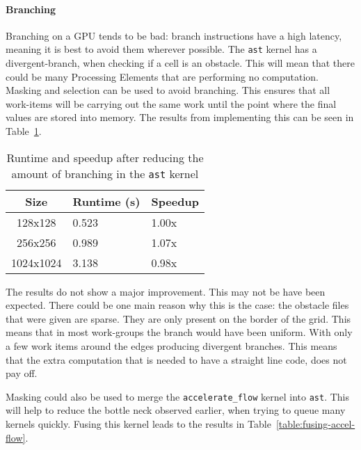 



\paragraph{Branching}
Branching on a GPU tends to be bad: branch instructions have a high latency, meaning it is best to avoid them wherever possible. The \texttt{ast} kernel has a divergent-branch, when checking if a cell is an obstacle. This will mean that there could be many Processing Elements that are performing no computation. Masking and selection can be used to avoid branching. This ensures that all work-items will be carrying out the same work until the point where the final values are stored into memory. The results from implementing this can be seen in Table~\ref{table:branching}.

\begin{table}[ht]
\vspace{-3mm}
\centering
\caption{Runtime and speedup after reducing the amount of branching in the \texttt{ast} kernel}
\vspace{1mm}
\begin{tabular}{|c||p{5.8em}|p{4.8em}|}
    \hline
    Size & Runtime (s) & Speedup \\
    \hline
    128x128 & 0.523 & 1.00x \\
    \hline
    256x256 & 0.989 & 1.07x \\
    \hline
    1024x1024 & 3.138 & 0.98x \\
    \hline
\end{tabular}
\label{table:branching}
\vspace{-3mm}
\end{table}

The results do not show a major improvement. This may not be have been expected. There could be one main reason why this is the case: the obstacle files that were given are sparse. They are only present on the border of the grid. This means that in most work-groups the branch would have been uniform. With only a few work items around the edges producing divergent branches. This means that the extra computation that is needed to have a straight line code, does not pay off. 



Masking could also be used to merge the \texttt{accelerate\_flow} kernel into \texttt{ast}. This will help to reduce the bottle neck observed earlier, when trying to queue many kernels quickly. Fusing this kernel leads to the results in Table~\ref{table:fusing-accel-flow}.

